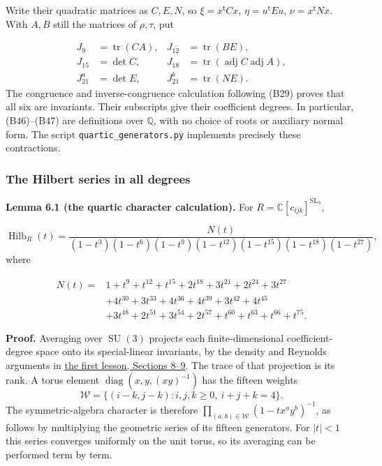 \documentclass[
]{article}
\begin{document}
Write their quadratic matrices as \(C,E,N\), so \(\xi=x^{\mathsf t}Cx\),
\(\eta=u^{\mathsf t}Eu\), \(\nu=x^{\mathsf t}Nx\). With \(A,B\) still
the matrices of \(\rho,\tau\), put
\protect{}\label{equation-B47}{}

\[
\begin{aligned}
J_9&=\operatorname{tr}(CA),&J_{12}&=\operatorname{tr}(BE),\\
J_{15}&=\det C,&J_{18}&=\operatorname{tr}(\operatorname{adj}C\operatorname{adj}A),\\
J_{21}^{a}&=\det E,&J_{21}^{b}&=\operatorname{tr}(NE).
\end{aligned}
\tag{B47}
\] The congruence and inverse-congruence calculation following (B29)
proves that all six are invariants. Their subscripts give their
coefficient degrees. In particular, (B46)--(B47) are definitions over
\(\mathbb Q\), with no choice of roots or auxiliary normal form. The
script \texttt{quartic\_generators.py} implements precisely these
contractions.

\subsubsection{The Hilbert series in all
degrees}\label{the-hilbert-series-in-all-degrees}

\protect{}\label{lemma-6-1}{}

\textbf{Lemma 6.1 (the quartic character calculation).} For
\(R=\mathbb C [c_{ijk}]^{\operatorname{SL}_3}\),
\protect{}\label{equation-B48}{}

\[
\operatorname{Hilb}_R(t)=
\frac{N(t)}{(1-t^3)(1-t^6)(1-t^9)(1-t^{12})(1-t^{15})(1-t^{18})(1-t^{27})},
\tag{B48}
\] where \protect{}\label{equation-B49}{}

\[
\begin{aligned}
N(t)={}&1+t^9+t^{12}+t^{15}+2t^{18}+3t^{21}+2t^{24}+3t^{27}\\
&+4t^{30}+3t^{33}+4t^{36}+4t^{39}+3t^{42}+4t^{45}\\
&+3t^{48}+2t^{51}+3t^{54}+2t^{57}+t^{60}+t^{63}+t^{66}+t^{75}.
\end{aligned}
\tag{B49}
\]

\textbf{Proof.} Averaging over \(\operatorname{SU}(3)\) projects each
finite-dimensional coefficient-degree space onto its special-linear
invariants, by the density and Reynolds arguments in
\href{NOE-INV-01.html\#section-8}{the first lesson, Sections 8--9}. The
trace of that projection is its rank. A torus element
\(\operatorname{diag}(x,y,(xy)^{-1})\) has the fifteen weights \[
\mathcal W=\{(i-k,j-k):i,j,k\geq0,\ i+j+k=4\}.
\] The symmetric-algebra character is therefore
\(\prod_{(a,b)\in\mathcal W}(1-tx^ay^b)^{-1}\), as follows by
multiplying the geometric series of its fifteen generators. For
\(|t|<1\) this series converges uniformly on the unit torus, so its
averaging can be performed term by term.
\end{document}
